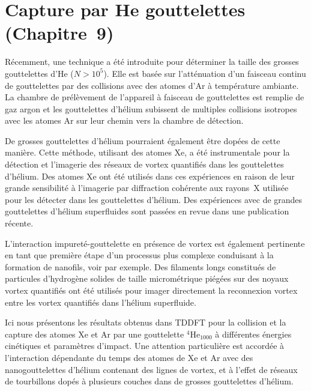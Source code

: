 	\section*{Capture par He gouttelettes\\\small(Chapitre~9)}
		Récemment, une technique a été introduite pour déterminer la taille des grosses gouttelettes d'He ($N>10^5$). Elle est basée sur l'atténuation d'un faisceau continu de gouttelettes par des collisions avec des atomes d'Ar à température ambiante\citep{Gom11}. La chambre de prélèvement de l'appareil à faisceau de gouttelettes est remplie de gaz argon et les gouttelettes d'hélium subissent de multiples collisions isotropes avec les atomes Ar sur leur chemin vers la chambre de détection.
		
		De grosses gouttelettes d'hélium pourraient également être dopées de cette manière. Cette méthode, utilisant des atomes Xe, a été instrumentale pour la détection et l'imagerie des réseaux de vortex quantifiés dans les gouttelettes d'hélium\citep{Gom14,Jones2016}. Des atomes Xe ont été utilisés dans ces expériences en raison de leur grande sensibilité à l'imagerie par diffraction cohérente aux rayons~X utilisée pour les détecter dans les gouttelettes d'hélium. Des expériences avec de grandes gouttelettes d'hélium superfluides sont passées en revue dans une publication récente\citep{Tan17}.
		
		L'interaction impureté-gouttelette en présence de vortex est également pertinente en tant que première étape d'un processus plus complexe conduisant à la formation de nanofils, voir par exemple. Des filaments longs constitués de particules d'hydrogène solides de taille micrométrique piégées sur des noyaux vortex quantifiés ont été utilisés pour imager directement la reconnexion vortex entre les vortex quantifiés dans l'hélium superfluide\citep{Bewley2008}.
		
		Ici nous présentons les résultats obtenus dans TDDFT pour la collision et la capture des atomes Xe et Ar par une gouttelette $^4$He$_{1000}$ à différentes énergies cinétiques et paramètres d'impact. Une attention particulière est accordée à l'interaction dépendante du temps des atomes de Xe et Ar avec des nanogouttelettes d'hélium contenant des lignes de vortex, et à l'effet de réseaux de tourbillons dopés à plusieurs couches dans de grosses gouttelettes d'hélium.
		
